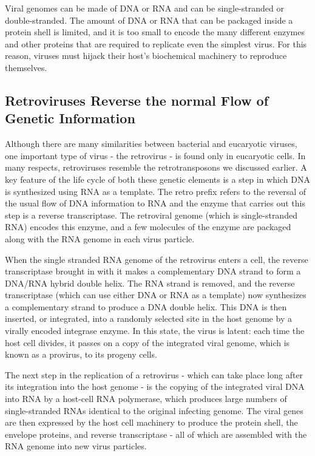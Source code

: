 Viral genomes can be made of DNA or RNA and can be single-stranded
or double-stranded. The amount of DNA or RNA that can be
packaged inside a protein shell is limited, and it is too small to encode the
many different enzymes and other proteins that are required to replicate
even the simplest virus. For this reason, viruses must hijack their host’s
biochemical machinery to reproduce themselves.

\subsection{Retroviruses Reverse the normal Flow of Genetic Information}

Although there are many similarities between bacterial and eucaryotic
viruses, one important type of virus - the retrovirus - is found only in
eucaryotic cells. In many respects, retroviruses resemble the retrotransposons
we discussed earlier. A key feature of the life cycle of both these
genetic elements is a step in which DNA is synthesized using RNA as a
template. The retro prefix refers to the reversal of the usual flow of DNA
information to RNA and the enzyme that carries out this
step is a reverse transcriptase. The retroviral genome (which is single-stranded
RNA) encodes this enzyme, and a few molecules of the enzyme
are packaged along with the RNA genome in each virus particle.

When the single stranded RNA genome of the retrovirus enters a cell, the reverse
transcriptase brought in with it makes a complementary DNA strand
to form a DNA/RNA hybrid double helix. The RNA strand is removed,
and the reverse transcriptase (which can use either DNA or RNA as a
template) now synthesizes a complementary strand to produce a DNA
double helix. This DNA is then inserted, or integrated, into a randomly
selected site in the host genome by a virally encoded integrase enzyme.
In this state, the virus is latent: each time the host cell divides, it passes
on a copy of the integrated viral genome, which is known as a provirus,
to its progeny cells.

The next step in the replication of a retrovirus - which can take place
long after its integration into the host genome - is the copying of the
integrated viral DNA into RNA by a host-cell RNA polymerase, which
produces large numbers of single-stranded RNAs identical to the original
infecting genome. The viral genes are then expressed by the host
cell machinery to produce the protein shell, the envelope proteins, and
reverse transcriptase - all of which are assembled with the RNA genome
into new virus particles.

